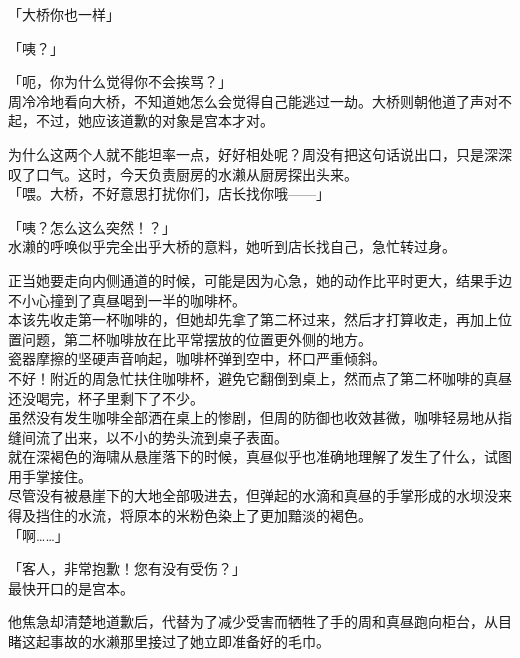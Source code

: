 「大桥你也一样」

「咦？」

「呃，你为什么觉得你不会挨骂？」\\

周冷冷地看向大桥，不知道她怎么会觉得自己能逃过一劫。大桥则朝他道了声对不起，不过，她应该道歉的对象是宫本才对。

为什么这两个人就不能坦率一点，好好相处呢？周没有把这句话说出口，只是深深叹了口气。这时，今天负责厨房的水濑从厨房探出头来。\\

「喂。大桥，不好意思打扰你们，店长找你哦——」

「咦？怎么这么突然！？」\\

水濑的呼唤似乎完全出乎大桥的意料，她听到店长找自己，急忙转过身。

正当她要走向内侧通道的时候，可能是因为心急，她的动作比平时更大，结果手边不小心撞到了真昼喝到一半的咖啡杯。\\

本该先收走第一杯咖啡的，但她却先拿了第二杯过来，然后才打算收走，再加上位置问题，第二杯咖啡放在比平常摆放的位置更外侧的地方。\\

瓷器摩擦的坚硬声音响起，咖啡杯弹到空中，杯口严重倾斜。\\

不好！附近的周急忙扶住咖啡杯，避免它翻倒到桌上，然而点了第二杯咖啡的真昼还没喝完，杯子里剩下了不少。\\

虽然没有发生咖啡全部洒在桌上的惨剧，但周的防御也收效甚微，咖啡轻易地从指缝间流了出来，以不小的势头流到桌子表面。\\

就在深褐色的海啸从悬崖落下的时候，真昼似乎也准确地理解了发生了什么，试图用手掌接住。\\

尽管没有被悬崖下的大地全部吸进去，但弹起的水滴和真昼的手掌形成的水坝没来得及挡住的水流，将原本的米粉色染上了更加黯淡的褐色。\\

「啊……」

「客人，非常抱歉！您有没有受伤？」\\

最快开口的是宫本。

他焦急却清楚地道歉后，代替为了减少受害而牺牲了手的周和真昼跑向柜台，从目睹这起事故的水濑那里接过了她立即准备好的毛巾。\\

